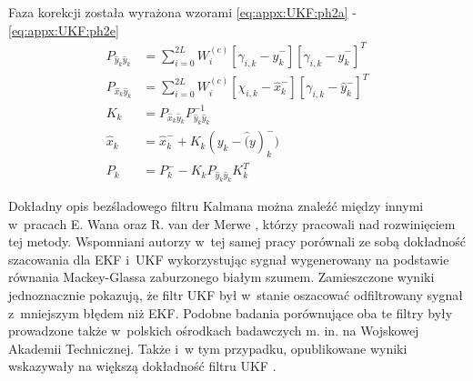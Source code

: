 Faza korekcji została wyrażona wzorami \eqref{eq:appx:UKF:ph2a} - \eqref{eq:appx:UKF:ph2e}
\begin{subequations}
	\begin{align}
		P_{\widehat{y}_k\widehat{y}_k} & = \sum_{i=0}^{2L}W_i^{(c)}[\gamma_{i,k} - \widehat{y}^-_k][\gamma_{i,k} - \widehat{y}^-_k]^T\label{eq:appx:UKF:ph2a} \\
		P_{\widehat{x}_k\widehat{y}_k} & = \sum_{i=0}^{2L}W_i^{(c)}[\chi_{i,k} - \widehat{x}^-_k][\gamma_{i,k} - \widehat{y}^-_k]^T\label{eq:appx:UKF:ph2b}   \\
		K_k                            & = P_{\widehat{x}_k\widehat{y}_k} P^{-1}_{\widehat{y}_k\widehat{y}_k} \label{eq:appx:UKF:ph2c}                        \\
		\widehat{x}_k                  & = \widehat{x}^-_{k} + K_k(y_k - \widehat(y)^-_k) \label{eq:appx:UKF:ph2d}                                            \\
		P_k                            & = P^-_k - K_kP_{\widehat{y}_k\widehat{y}_k}K_k^T \label{eq:appx:UKF:ph2e}                                            
	\end{align}
\end{subequations}


Dokładny opis bezśladowego filtru Kalmana można znaleźć między innymi w~pracach E. Wana oraz R. van der Merwe \cite{Wan2000, Wan2001}, którzy pracowali nad rozwinięciem tej metody. Wspomniani autorzy w~tej samej pracy porównali ze sobą dokładność szacowania dla EKF i~UKF wykorzystując sygnał wygenerowany na podstawie równania Mackey-Glassa \cite{Glass2010} zaburzonego białym szumem. Zamieszczone wyniki jednoznacznie pokazują, że filtr UKF był w~stanie oszacować odfiltrowany sygnał z~mniejszym błędem niż EKF. Podobne badania porównujące oba te filtry były prowadzone także w~polskich ośrodkach badawczych m. in. na Wojskowej Akademii Technicznej. Także i~w tym przypadku, opublikowane wyniki wskazywały na większą dokładność filtru UKF \cite{Konatowski2007, Konatowski2007a}.

